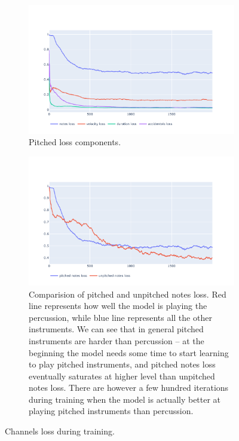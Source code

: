 \documentclass[en]{pracamgr}
\begin{document}
\begin{figure}
    \centering
    \begin{subfigure}{\linewidth}
        \centering
        \includegraphics[width=.9\linewidth]{figures/pitched.pdf}
        \caption{Pitched loss components.}
    \end{subfigure}
    \begin{subfigure}{\linewidth}
        \centering
        \includegraphics[width=.9\linewidth]{figures/notes.pdf}
        \caption{
            Comparision of pitched and unpitched notes loss.
            Red line represents how well the model is playing the percussion, while blue line represents all the other instruments.
            We can see that in general pitched instruments are harder than percussion -- at the beginning the model needs some time to start learning to play pitched instruments, and pitched notes loss eventually saturates at higher level than unpitched notes loss.
            There are however a few hundred iterations during training when the model is actually better at playing pitched instruments than percussion.
        }
        \label{fig:pitched_vs_unptiched}
    \end{subfigure}
    \caption{Channels loss during training.}
    \label{fig:channels}
\end{figure}
\end{document}
